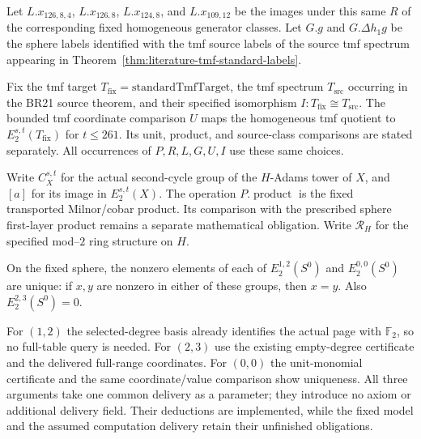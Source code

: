 \begin{definition}
  Let $L.x_{126,8,4}$, $L.x_{126,8}$, $L.x_{124,8}$, and
  $L.x_{109,12}$ be the images under this same $R$ of the corresponding
  fixed homogeneous generator classes. Let $G.g$ and
  $G.\Delta h_1g$ be the sphere labels identified with the tmf source
  labels of the source tmf spectrum appearing in
  Theorem~\ref{thm:literature-tmf-standard-labels}.

  Fix the tmf target $T_{\mathrm{fix}}=\mathrm{standardTmfTarget}$,
  the tmf spectrum $T_{\mathrm{src}}$ occurring in the BR21 source
  theorem, and their specified isomorphism
  $I:T_{\mathrm{fix}}\cong T_{\mathrm{src}}$.
  The bounded tmf coordinate comparison $U$ maps the homogeneous
  tmf quotient to $E_2^{s,t}(T_{\mathrm{fix}})$ for $t\le261$.
  Its unit, product, and source-class comparisons are stated separately.
  All occurrences of $P,R,L,G,U,I$ use these same choices.

  Write $C_X^{s,t}$ for the actual second-cycle group of the $H$-Adams
  tower of $X$, and $[a]$ for its image in $E_2^{s,t}(X)$.
  The operation $P.\operatorname{product}$ is the fixed transported
  Milnor/cobar product. Its comparison with the prescribed sphere
  first-layer product remains a separate mathematical obligation. Write $\mathcal R_H$ for the
  specified mod--$2$ ring structure on $H$.
\end{definition}

\begin{lemma}
  \label{lem:computation-sphere-low-degrees}
  \notready
  On the fixed sphere, the nonzero elements of each of
  $E_2^{1,2}(S^0)$ and $E_2^{0,0}(S^0)$ are unique: if $x,y$ are
  nonzero in either of these groups, then $x=y$. Also
  $E_2^{2,3}(S^0)=0$.

  For $(1,2)$ the selected-degree basis already identifies the actual
  page with $\mathbb F_2$, so no full-table query is needed. For $(2,3)$
  use the existing empty-degree certificate and the delivered full-range
  coordinates. For $(0,0)$ the unit-monomial certificate and the same
  coordinate/value comparison show uniqueness. All three arguments take
  one common delivery as a parameter; they introduce no axiom or additional
  delivery field. Their deductions are implemented, while the fixed model
  and the assumed computation delivery retain their unfinished obligations.
\end{lemma}

